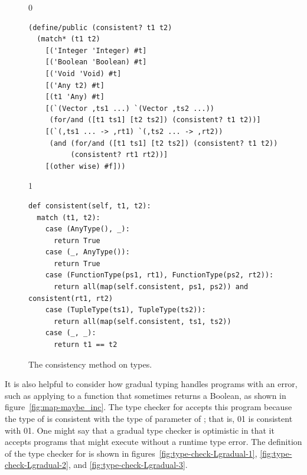 \documentclass[7x10]{TimesAPriori_MIT}%
\newcommand{\gray}[1]{{\color{gray} #1}}
\def\racketEd{0}
\def\pythonEd{1}
\providecommand{\BookEdition}{1}
\let\edition\BookEdition
\newcommand{\racket}[1]{{\if\edition\racketEd{#1}\fi}}
\newcommand{\pythonColor}[0]{}
\newcommand{\python}[1]{{\if\edition\pythonEd\pythonColor #1\fi}}
\numberwithin{theorem}{chapter}
\numberwithin{definition}{chapter}
\numberwithin{equation}{chapter}
\begin{document}
\begin{figure}[tbp]
  \begin{tcolorbox}[colback=white]
{\if\edition\racketEd    
\begin{lstlisting}
(define/public (consistent? t1 t2)
  (match* (t1 t2)
    [('Integer 'Integer) #t]
    [('Boolean 'Boolean) #t]
    [('Void 'Void) #t]
    [('Any t2) #t]
    [(t1 'Any) #t]
    [(`(Vector ,ts1 ...) `(Vector ,ts2 ...))
     (for/and ([t1 ts1] [t2 ts2]) (consistent? t1 t2))]
    [(`(,ts1 ... -> ,rt1) `(,ts2 ... -> ,rt2))
     (and (for/and ([t1 ts1] [t2 ts2]) (consistent? t1 t2))
          (consistent? rt1 rt2))]
    [(other wise) #f]))
\end{lstlisting}
\fi}
{\if\edition\pythonEd\pythonColor
\begin{lstlisting}
def consistent(self, t1, t2):
  match (t1, t2):
    case (AnyType(), _):
      return True
    case (_, AnyType()):
      return True
    case (FunctionType(ps1, rt1), FunctionType(ps2, rt2)):
      return all(map(self.consistent, ps1, ps2)) and consistent(rt1, rt2)
    case (TupleType(ts1), TupleType(ts2)):
      return all(map(self.consistent, ts1, ts2))
    case (_, _):
      return t1 == t2
\end{lstlisting}  
  \fi}
\vspace{-5pt}
  \end{tcolorbox}

  \caption{The consistency method on types.}
\label{fig:consistent}
\end{figure}

It is also helpful to consider how gradual typing handles programs with an
error, such as applying  to a function that sometimes
returns a Boolean, as shown in figure~\ref{fig:map-maybe_inc}.  The
type checker for \LangGrad{} accepts this program because the type of
 is consistent with the type of parameter  of
; that is, 
\racket{}\python{}
is consistent with
\racket{}\python{}.
One might say that a gradual type checker is optimistic in that it
accepts programs that might execute without a runtime type error.
%
The definition of the type checker for \LangGrad{} is shown in
figures~\ref{fig:type-check-Lgradual-1}, \ref{fig:type-check-Lgradual-2},
and \ref{fig:type-check-Lgradual-3}.

\end{document}
